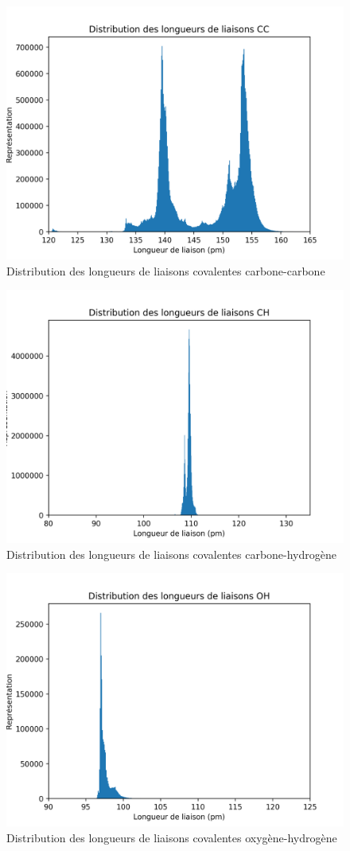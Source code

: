 \begin{figure}
	\centering
	\includegraphics[scale=0.8]{../figures/distribCC.png}
	\caption{Distribution des longueurs de liaisons covalentes carbone-carbone}
	\label{fdistrib_cc}
\end{figure}

\begin{figure}
	\centering
	\includegraphics[scale=0.8]{../figures/distribCH.png}
	\caption{Distribution des longueurs de liaisons covalentes carbone-hydrogène}
	\label{fdistrib_ch}
\end{figure}

\begin{figure}
	\centering
	\includegraphics[scale=0.8]{../figures/distribOH.png}
	\caption{Distribution des longueurs de liaisons covalentes oxygène-hydrogène}
	\label{fdistrib_oh}
\end{figure}